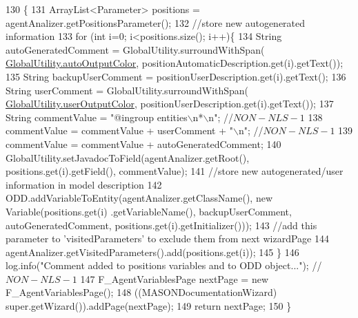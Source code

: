 \begin{DoxyCode}
130                                     \{ 
131         ArrayList<Parameter> positions = agentAnalizer.getPositionsParameter();
132         \textcolor{comment}{//store new autogenerated information}
133         \textcolor{keywordflow}{for} (\textcolor{keywordtype}{int} i=0; i<positions.size(); i++)\{
134             String autoGeneratedComment = GlobalUtility.surroundWithSpan(
      \hyperlink{classit_1_1isislab_1_1masonhelperdocumentation_1_1analizer_1_1_global_utility_a42aa676ad1ff27c42cd4aab651ff2a35}{GlobalUtility.autoOutputColor}, positionAutomaticDescription.get(i).getText());
135             String backupUserComment = positionUserDescription.get(i).getText();
136             String userComment = GlobalUtility.surroundWithSpan(
      \hyperlink{classit_1_1isislab_1_1masonhelperdocumentation_1_1analizer_1_1_global_utility_aec864cd710b27ece609c5a6093211ff4}{GlobalUtility.userOutputColor}, positionUserDescription.get(i).getText());
137             String commentValue = \textcolor{stringliteral}{"@ingroup entities\(\backslash\)n*\(\backslash\)n"}; \textcolor{comment}{//$NON-NLS-1$}
138             commentValue = commentValue + userComment + \textcolor{stringliteral}{"\(\backslash\)n"}; \textcolor{comment}{//$NON-NLS-1$}
139             commentValue = commentValue + autoGeneratedComment;
140             GlobalUtility.setJavadocToField(agentAnalizer.getRoot(), positions.get(i).getField(), 
      commentValue);
141             \textcolor{comment}{//store new autogenerated/user information in model description}
142             ODD.addVariableToEntity(agentAnalizer.getClassName(), \textcolor{keyword}{new} Variable(positions.get(i)
      .getVariableName(), backupUserComment, autoGeneratedComment, positions.get(i).getInitializer()));
143             \textcolor{comment}{//add this parameter to 'visitedParameters' to exclude them from next wizardPage}
144             agentAnalizer.getVisitedParameters().add(positions.get(i));
145         \}
146         log.info(\textcolor{stringliteral}{"Comment added to positions variables and to ODD object..."}); \textcolor{comment}{//$NON-NLS-1$}
147         F\_AgentVariablesPage nextPage = \textcolor{keyword}{new} F\_AgentVariablesPage();
148         ((MASONDocumentationWizard) super.getWizard()).addPage(nextPage);
149         \textcolor{keywordflow}{return} nextPage; 
150     \}
\end{DoxyCode}
